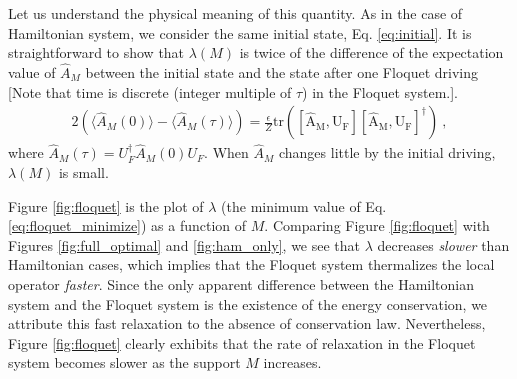 \documentclass[twocolumn,superscriptaddress, prb]{revtex4-1}
\begin{document}
Let us understand the physical meaning of this quantity.
As in the case of Hamiltonian system, we consider the same initial state, Eq. \eqref{eq:initial}.
It is straightforward to show that $\lambda(M)$ is twice of the
difference of the expectation value of $\hat{A}_M$ between the initial state and the state after one Floquet driving
[Note that time is discrete (integer multiple of $\tau$) in the Floquet system.].
\begin{align}
2\left(\langle \hat{A}_M(0) \rangle - \langle \hat{A}_M(\tau) \rangle \right) = \frac{\epsilon}{Z}\mathrm{tr([\hat{A}_M,U_F][\hat{A}_M,U_F]^\dag)} ~,
\end{align}
where $\hat{A}_M(\tau) = U_F^\dag \hat{A}_M(0) U_F$.
When $\hat{A}_M$ changes little by the initial driving, $\lambda(M)$ is small. %

Figure \ref{fig:floquet} is the plot of $\lambda$ (the minimum value of Eq. \ref{eq:floquet_minimize}) as a function of $M$.
Comparing Figure \ref{fig:floquet} with Figures \ref{fig:full_optimal} and \ref{fig:ham_only},
we see that $\lambda$ decreases {\it slower} than Hamiltonian cases, which implies that the Floquet system thermalizes
the local operator {\it faster}. Since the only apparent difference between the Hamiltonian system and the Floquet system
is the existence of the energy conservation, we attribute this fast relaxation to the absence of conservation law.
Nevertheless, Figure \ref{fig:floquet} clearly exhibits that the rate of relaxation in the Floquet system
becomes slower as the support $M$ increases.



\end{document}
